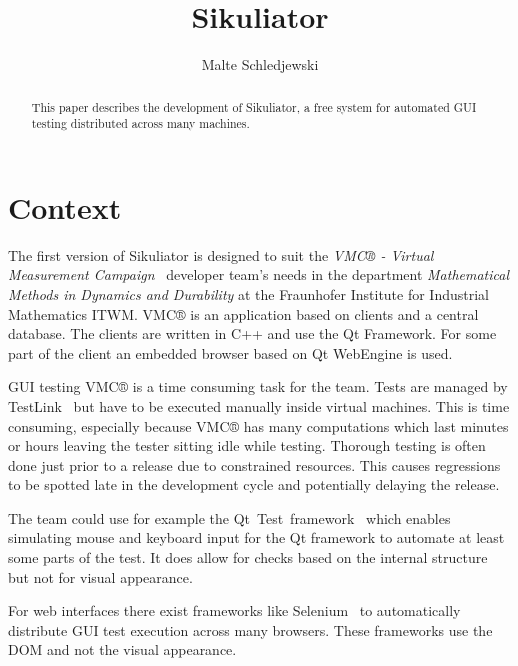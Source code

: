 \documentclass[a4paper,twocolumn]{article}
\title{Sikuliator}
\author{Malte Schledjewski}
\newcommand{\VMC}[0]{VMC®}
\newcommand{\Sik}[0]{Sikuliator}
\begin{document}


\maketitle
\begin{abstract}
	
	
	This paper describes the development of \Sik{}, 
	a free system for automated GUI testing distributed across many machines.
\end{abstract}
\listoftodos

\tableofcontents

\section{Context}

The first version of \Sik{} is designed to suit the 
\emph{\VMC{} - Virtual Measurement Campaign}~\cite{VMConline} developer team's needs in the
department \emph{Mathematical Methods in Dynamics and Durability} 
at the Fraunhofer Institute for Industrial Mathematics ITWM.
\VMC{} is an application based on clients and a central database.
The clients are written in C++ and use the Qt Framework.
For some part of the client an embedded browser based on Qt WebEngine is used.

GUI testing \VMC{} is a time consuming task for the team.
Tests are managed by TestLink~\cite{TestLink} but have to be executed manually inside virtual machines.
This is time consuming, especially because \VMC{} has many computations which last minutes or hours 
leaving the tester sitting idle while testing. 
Thorough testing is often done just prior to a release due to constrained resources.
This causes regressions to be spotted late in the development cycle and potentially delaying the release. 

The team could use for example the Qt~Test~framework~\cite{QtTest} which enables simulating mouse and keyboard input for the Qt framework to automate at least some parts of the test.
It does allow for checks based on the internal structure but not for visual appearance.

For web interfaces there exist frameworks like Selenium~\cite{Selenium} to automatically distribute GUI test execution across many browsers.
These frameworks use the DOM and not the visual appearance.
\end{document}
